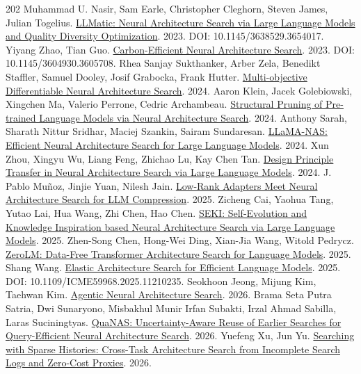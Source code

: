 \begin{thebibliography}{202}
 Muhammad U. Nasir, Sam Earle, Christopher Cleghorn, Steven James, Julian Togelius. \href{https://arxiv.org/abs/2306.01102}{LLMatic: Neural Architecture Search via Large Language Models and Quality Diversity Optimization}. 2023. DOI: 10.1145/3638529.3654017.
 Yiyang Zhao, Tian Guo. \href{https://arxiv.org/abs/2307.04131v1}{Carbon-Efficient Neural Architecture Search}. 2023. DOI: 10.1145/3604930.3605708.
 Rhea Sanjay Sukthanker, Arber Zela, Benedikt Staffler, Samuel Dooley, Josif Grabocka, Frank Hutter. \href{https://arxiv.org/abs/2402.18213v3}{Multi-objective Differentiable Neural Architecture Search}. 2024.
 Aaron Klein, Jacek Golebiowski, Xingchen Ma, Valerio Perrone, Cedric Archambeau. \href{https://arxiv.org/abs/2405.02267v2}{Structural Pruning of Pre-trained Language Models via Neural Architecture Search}. 2024.
 Anthony Sarah, Sharath Nittur Sridhar, Maciej Szankin, Sairam Sundaresan. \href{https://arxiv.org/abs/2405.18377v1}{LLaMA-NAS: Efficient Neural Architecture Search for Large Language Models}. 2024.
 Xun Zhou, Xingyu Wu, Liang Feng, Zhichao Lu, Kay Chen Tan. \href{https://arxiv.org/abs/2408.11330v2}{Design Principle Transfer in Neural Architecture Search via Large Language Models}. 2024.
 J. Pablo Muñoz, Jinjie Yuan, Nilesh Jain. \href{https://arxiv.org/abs/2501.16372v1}{Low-Rank Adapters Meet Neural Architecture Search for LLM Compression}. 2025.
 Zicheng Cai, Yaohua Tang, Yutao Lai, Hua Wang, Zhi Chen, Hao Chen. \href{https://arxiv.org/abs/2502.20422v1}{SEKI: Self-Evolution and Knowledge Inspiration based Neural Architecture Search via Large Language Models}. 2025.
 Zhen-Song Chen, Hong-Wei Ding, Xian-Jia Wang, Witold Pedrycz. \href{https://arxiv.org/abs/2503.18646v1}{ZeroLM: Data-Free Transformer Architecture Search for Language Models}. 2025.
 Shang Wang. \href{https://arxiv.org/abs/2510.27037v1}{Elastic Architecture Search for Efficient Language Models}. 2025. DOI: 10.1109/ICME59968.2025.11210235.
 Seokhoon Jeong, Mijung Kim, Taehwan Kim. \href{https://arxiv.org/abs/2607.07984v1}{Agentic Neural Architecture Search}. 2026.
 Brama Seta Putra Satria, Dwi Sunaryono, Misbakhul Munir Irfan Subakti, Irzal Ahmad Sabilla, Laras Suciningtyas. \href{https://arxiv.org/abs/2610.31251v2}{QuaNAS: Uncertainty-Aware Reuse of Earlier Searches for Query-Efficient Neural Architecture Search}. 2026.
 Yuefeng Xu, Jun Yu. \href{https://arxiv.org/abs/2610.32179v1}{Searching with Sparse Histories: Cross-Task Architecture Search from Incomplete Search Logs and Zero-Cost Proxies}. 2026.

\end{thebibliography}
